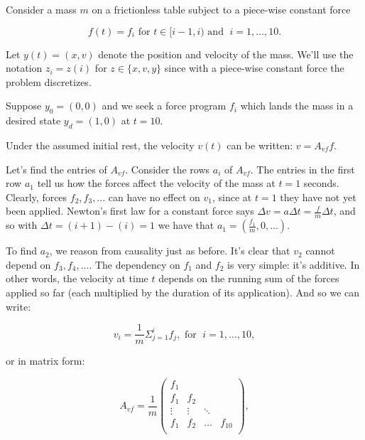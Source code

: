 \documentclass[12pt]{article}
\begin{document}
Consider a mass $m$ on a frictionless table subject to a piece-wise constant force

\begin{equation*}
	f(t) = f_i \text{ for } t \in [i - 1, i) \text{ and } \; i = 1, \ldots, 10.
\end{equation*}

\bigbreak

Let $y(t) = (x, v)$ denote the position and velocity of the mass. We'll use the notation $z_i = z(i)$ for $z \in \{x, v, y\}$ since with a piece-wise
constant force the problem discretizes. 

Suppose $y_0 = (0, 0)$ and we seek a force program $f_i$  which lands the mass in a desired state $y_d = (1, 0)$ at $ t = 10$. 

\bigbreak

\noindent Under the assumed initial rest, the velocity $v(t)$ can be written: $v = A_{vf} f$.

\bigbreak

\noindent Let's find the entries of $A_{vf}$. Consider the rows $a_i$ of $A_{vf}$. The entries in the first row $a_1$ tell us how the forces affect the velocity of the mass at $t = 1$ seconds. Clearly, forces $f_2, f_3, ...$ can have no effect on $v_1$, since at $t = 1$ they have not yet been applied. Newton's first law for a constant force says $\Delta v = a \Delta t = \frac{f}{m} \Delta t$, and so with $\Delta t = (i+1) - (i) = 1$ we have that $a_1 = (\frac{f_1}{m}, 0, ...)$.

\bigbreak

\noindent To find $a_2$, we reason from causality just as before. It's clear that $v_2$ cannot depend on $f_3, f_4, ...$. The dependency on $f_1$ and $f_2$ is very simple: it's additive. In other words, the velocity at time $t$ depends on the running sum of the forces applied so far (each multiplied by the duration of its application). 
And so we can write: 

\begingroup
\Large
\begin{equation*}
	v_i = \frac{1}{m} \Sigma_{j = 1}^{i} f_j, \text{ for } \; i = 1, \ldots, 10,
\end{equation*}
\endgroup

or in matrix form:

\begin{equation*}
	A_{vf} = \frac{1}{m}
	\begin{pmatrix}
	    f_1    &        &        &        \\
	    f_1    &  f_2   &        &        \\
	    \vdots & \vdots & \ddots &        \\
	    f_1    & f_2    & \hdots & f_{10} \\
	\end{pmatrix},
\end{equation*}
\end{document}
